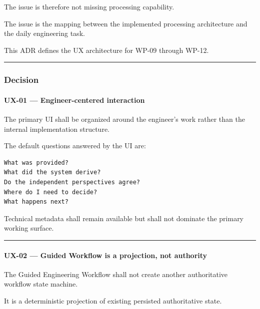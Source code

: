 The issue is therefore not missing processing capability.

The issue is the mapping between the implemented processing architecture and the daily engineering task.

This ADR defines the UX architecture for WP-09 through WP-12.

\begin{center}\rule{0.5\linewidth}{0.5pt}\end{center}

\hypertarget{decision-9}{%
\subsubsection{Decision}\label{decision-9}}

\hypertarget{ux-01--engineer-centered-interaction}{%
\paragraph{UX-01 --- Engineer-centered interaction}\label{ux-01--engineer-centered-interaction}}

The primary UI shall be organized around the engineer's work rather than the internal implementation structure.

The default questions answered by the UI are:

\begin{verbatim}
What was provided?
What did the system derive?
Do the independent perspectives agree?
Where do I need to decide?
What happens next?
\end{verbatim}

Technical metadata shall remain available but shall not dominate the primary working surface.

\begin{center}\rule{0.5\linewidth}{0.5pt}\end{center}

\hypertarget{ux-02--guided-workflow-is-a-projection-not-authority}{%
\paragraph{UX-02 --- Guided Workflow is a projection, not authority}\label{ux-02--guided-workflow-is-a-projection-not-authority}}

The Guided Engineering Workflow shall not create another authoritative workflow state machine.

It is a deterministic projection of existing persisted authoritative state.

